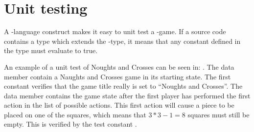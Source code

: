 

\section{Unit testing}
A \productname{}-language construct makes it easy to unit test a \productname{}-game.
If a source code contains a type which extends the -type, it means that any constant defined in the type must evaluate to true.

An example of a unit test of Noughts and Crosses can be seen in:
.
The data member  contain a Naughts and Crosses game in its starting state.
The first constant  verifies that the game title really is set to ``Noughts and Crosses''.
The data member  contains the game state after the first player has 
performed the first action in the list of possible actions. This first action will cause a piece to be placed on one of the squares, which means 
that $3*3 - 1 = 8$ squares must still be empty. This is verified by the test constant .


